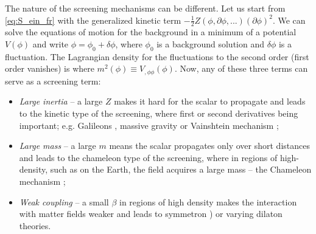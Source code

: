 The nature of the screening mechanisms can be different. Let us start from \eqref{eq:S_ein_fr} with the generalized kinetic term $-\frac12 Z(\phi,\partial\phi,...)(\partial\phi)^2$. We can solve the equations of motion for the background in a minimum of a potential $V(\phi)$ and write $\phi=\phi_0+\delta\phi$, where $\phi_0$ is a background solution and $\delta\phi$ is a fluctuation. The Lagrangian density for the fluctuations to the second order (first order vanishes) is
where $m^2(\phi)\equiv V_{,\phi\phi}(\phi)$. Now, any of these three terms can serve as a screening term:
\begin{itemize}
	\item  \textit{Large inertia} -- a large $Z$ makes it hard for the scalar to propagate and leads to the kinetic type of the screening, where first or second derivatives being important; e.g. Galileons \parencite{2009PhRvD..79f4036N}, massive gravity \parencite{2012RvMP...84..671H} or Vainshtein mechanism \parencite{2013CQGra..30r4001B};
	\item \textit{Large mass} --  a large $m$ means the scalar propagates only over short distances and leads to the chameleon type of the screening, where in regions of high-density, such as on the Earth, the field acquires a large mass -- the Chameleon mechanism \parencite{Waterhouse:2006wv};
	\item \textit{Weak coupling} -- a small $\beta$ in regions of high density makes the interaction with matter fields weaker and leads to symmetron \parencite{2010PhRvL.104w1301H}) or varying dilaton \parencite{Damour:1994zq,2011PhRvD..83j4026B} theories.
\end{itemize}
